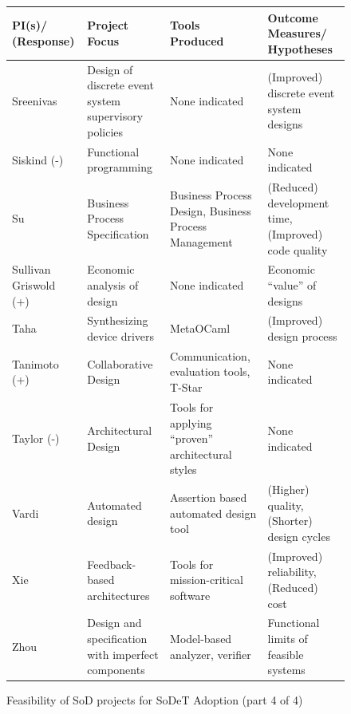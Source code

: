 \begin{figure}[ht]
\small
\begin{tabular}{|p{0.75in}|p{1.85in}|p{1.85in}|p{1.85in}|} \hline
{\bf PI(s)/ \newline (Response)} & {\bf Project Focus} & {\bf Tools Produced} & {\bf Outcome Measures/ \newline Hypotheses} \\ \hline

Sreenivas &
Design of discrete event system supervisory policies &
None indicated &
(Improved) discrete event system designs \\ \hline

Siskind (-)&
Functional programming &
None indicated &
None indicated \\ \hline

Su &
Business Process Specification &
Business Process Design, \newline Business Process Management &
(Reduced) development time, \newline (Improved) code quality \\ \hline

Sullivan \newline Griswold  (+)&
Economic analysis of design &
None indicated &
Economic ``value'' of designs \\ \hline

Taha &
Synthesizing device drivers &
MetaOCaml &
(Improved) design process \\ \hline

Tanimoto (+)&
Collaborative Design &
Communication,  evaluation tools, T-Star &
None indicated \\ \hline

Taylor (-) &
Architectural Design &
Tools for applying ``proven'' architectural styles &
None indicated \\ \hline


Vardi &
Automated design &
Assertion based automated design tool &
(Higher) quality, \newline (Shorter) design cycles \\ \hline

Xie &
Feedback-based architectures &
Tools for mission-critical software &
(Improved) reliability, \newline (Reduced) cost \\ \hline

Zhou &
Design and specification with imperfect components &
Model-based analyzer, verifier &
Functional limits of feasible systems \\ \hline

\end{tabular} 
\caption{Feasibility of SoD projects for SoDeT Adoption (part 4 of 4)}
\label{fig:sod-4}
\normalsize
\end{figure}

